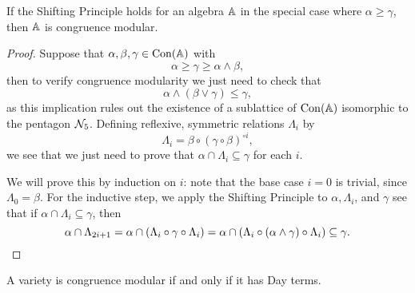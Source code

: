 \begin{appendices}
\begin{lem} If the Shifting Principle holds for an algebra $\mathbb{A}$ in the special case where $\alpha \ge \gamma$, then $\mathbb{A}$ is congruence modular.
\end{lem}
\begin{proof} Suppose that $\alpha, \beta, \gamma \in \operatorname{Con}(\mathbb{A})$ with
\[
\alpha \ge \gamma \ge \alpha \wedge \beta,
\]
then to verify congruence modularity we just need to check that
\[
\alpha \wedge (\beta \vee \gamma) \le \gamma,
\]
as this implication rules out the existence of a sublattice of $\operatorname{Con}(\mathbb{A})$ isomorphic to the pentagon $\mathcal{N}_5$. Defining reflexive, symmetric relations $\Lambda_i$ by
\[
\Lambda_i = \beta\circ (\gamma\circ\beta)^{\circ i},
\]
we see that we just need to prove that $\alpha \cap \Lambda_i \subseteq \gamma$ for each $i$.

We will prove this by induction on $i$: note that the base case $i = 0$ is trivial, since $\Lambda_0 = \beta$. For the inductive step, we apply the Shifting Principle to $\alpha, \Lambda_i$, and $\gamma$ see that if $\alpha \cap \Lambda_i \subseteq \gamma$, then
\[
\alpha \cap \Lambda_{2i+1} = \alpha \cap (\Lambda_i \circ \gamma \circ \Lambda_i) = \alpha \cap (\Lambda_i \circ (\alpha\wedge \gamma) \circ \Lambda_i) \subseteq \gamma.\qedhere
\]
\end{proof}

\begin{cor} A variety is congruence modular if and only if it has Day terms.
\end{cor}

\begin{comment}
\begin{cor} A variety $\cV$ is not congruence modular if and only if there are congruences $\alpha, \beta, \gamma$ on the free algebra $\cF_\cV(x,y,z,w)$ such that
\begin{align*}
\gamma &< \alpha,\\
\alpha \circ \beta &= \beta \circ \gamma \circ \beta,\\
\alpha \wedge \beta &\le \gamma.
\end{align*}
If $\cV$ is also idempotent, then we can strengthen the above as follows: $\cV$ fails to be congruence modular iff the congruence $\theta$ of $\cF_{\cV}(x,y)^2$ generated by identifying $(y,x)$ with $(y,y)$ satisfies
\[
\theta < \ker \pi_1, \;\;\; \ker \pi_2 \circ \theta \circ \ker \pi_2 = 1.
\]
\end{cor}
\begin{proof} Let $\theta_{a,b}$ be the congruence generated by identifying $a,b$, and define $\alpha = \theta_{x,y} \vee \theta_{z,w}, \beta = \theta_{x,z} \vee \theta_{y,w}$, and $\gamma = \theta_{z,w} \vee (\alpha \wedge \beta)$. Then $\gamma < \alpha$ iff $\cV$ fails to have Day terms, and the other displayed equations involving $\alpha,\beta,\gamma$ follow directly from the definitions.


\end{comment}
\end{appendices}
